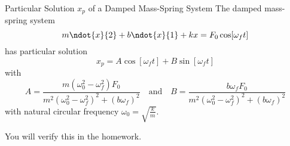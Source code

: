 \documentclass{beamer}
\begin{document}
\begin{frame}
\begin{block}{Particular Solution $x_p$ of a Damped Mass-Spring System}
The damped mass-spring system
\begin{equation*}
m\ndot{x}{2} + b\ndot{x}{1} +kx=F_0\cos[\omega_f t]
\end{equation*}
has particular solution
\begin{equation*}
x_p=A\cos[\omega_f t] +B\sin[\omega_f t]
\end{equation*}
with
\begin{equation*}
A=\dfrac%
{m\left(\omega_0^2-\omega_f^2\right)F_0}%
{m^2{\left(\omega_0^2-\omega_f^2\right)}^2+{\left(b\omega_f\right)}^2}%
\quad\text{and}\quad
B=\dfrac%
{b\omega_f F_0}%
{m^2{\left(\omega_0^2-\omega_f^2\right)}^2+{\left(b\omega_f\right)}^2}%
\end{equation*}
with natural circular frequency $\omega_0=\sqrt{\tfrac{k}{m}}$.
\end{block}\pause
\begin{block}{}
You will verify this in the homework.
\end{block}
\end{frame}
\end{document}
